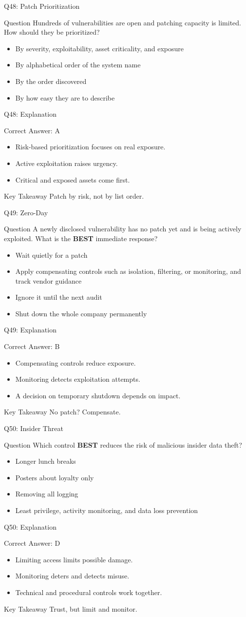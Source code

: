 \documentclass[aspectratio=169]{beamer}
\newcommand{\hq}[7]{%
	\begin{frame}{Q#1: #2}
		\begin{block}{Question}
			#3
		\end{block}
		\begin{itemize}
			#4
		\end{itemize}
	\end{frame}
	\begin{frame}{Q#1: Explanation}
		\begin{block}{Correct Answer: #5}
			\begin{itemize}
				#6
			\end{itemize}
		\end{block}
		\begin{alertblock}{Key Takeaway}
			#7
		\end{alertblock}
	\end{frame}
}
\begin{document}
	\hq{48}{Patch Prioritization}
	{Hundreds of vulnerabilities are open and patching capacity is limited. How should they be prioritized?}
	{\item[\textbf{(A)}] By severity, exploitability, asset criticality, and exposure
		\item[\textbf{(B)}] By alphabetical order of the system name
		\item[\textbf{(C)}] By the order discovered
		\item[\textbf{(D)}] By how easy they are to describe}
	{A}
	{\item Risk-based prioritization focuses on real exposure.
		\item Active exploitation raises urgency.
		\item Critical and exposed assets come first.}
	{Patch by risk, not by list order.}
	
	\hq{49}{Zero-Day}
	{A newly disclosed vulnerability has no patch yet and is being actively exploited. What is the \textbf{BEST} immediate response?}
	{\item[\textbf{(A)}] Wait quietly for a patch
		\item[\textbf{(B)}] Apply compensating controls such as isolation, filtering, or monitoring, and track vendor guidance
		\item[\textbf{(C)}] Ignore it until the next audit
		\item[\textbf{(D)}] Shut down the whole company permanently}
	{B}
	{\item Compensating controls reduce exposure.
		\item Monitoring detects exploitation attempts.
		\item A decision on temporary shutdown depends on impact.}
	{No patch? Compensate.}
	
	\hq{50}{Insider Threat}
	{Which control \textbf{BEST} reduces the risk of malicious insider data theft?}
	{\item[\textbf{(A)}] Longer lunch breaks
		\item[\textbf{(B)}] Posters about loyalty only
		\item[\textbf{(C)}] Removing all logging
		\item[\textbf{(D)}] Least privilege, activity monitoring, and data loss prevention}
	{D}
	{\item Limiting access limits possible damage.
		\item Monitoring deters and detects misuse.
		\item Technical and procedural controls work together.}
	{Trust, but limit and monitor.}
	
\end{document}
